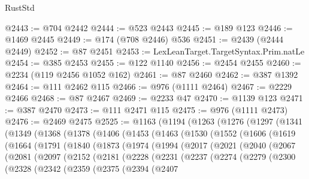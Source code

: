 \begin{lexlean}{RustStd}
\begin{coremodule}
@2443 := @704 @2442
@2444 := @523 @2443
@2445 := @189 @123
@2446 := @1469 @2445
@2449 := @174 (@708 @2446) @536
@2451 := @2439 (@2444 @2449)
@2452 := @87 @2451
@2453 := LexLeanTarget.TargetSyntax.Prim.natLe
@2454 := @385 @2453
@2455 := @122 @1140
@2456 := @2454 @2455
@2460 := @2234 (@119 @2456 @1052 @162)
@2461 := @87 @2460
@2462 := @387 @1392
@2464 := @111 @2462 @115
@2466 := @976 (@1111 @2464)
@2467 := @2229 @2466
@2468 := @87 @2467
@2469 := @2233 @47
@2470 := @1139 @123
@2471 := @387 @2470
@2473 := @111 @2471 @115
@2475 := @976 (@1111 @2473)
@2476 := @2469 @2475
@2525 := @1163
    (@1194
      (@1263
        (@1276
          (@1297
            (@1341
              (@1349
                (@1368
                  (@1378
                    (@1406
                      (@1453
                        (@1463
                          (@1530
                            (@1552
                              (@1606
                                (@1619
                                  (@1664
                                    (@1791
                                      (@1840
                                        (@1873
                                          (@1974
                                            (@1994
                                              (@2017
                                                (@2021
                                                  (@2040
                                                    (@2067
                                                      (@2081
                                                        (@2097
                                                          (@2152
                                                            (@2181
                                                              (@2228
                                                                (@2231
                                                                  (@2237
                                                                    (@2274
                                                                      (@2279
                                                                        (@2300
                                                                          (@2328
                                                                            (@2342
                                                                              (@2359
                                                                                (@2375
                                                                                  (@2394
                                                                                    (@2407

\end{coremodule}
\end{lexlean}
